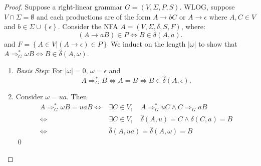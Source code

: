 \begin{proof}
  Suppose a right-linear grammar $G=\left( V,\Sigma,P,S \right)$. WLOG, suppose
  $V\cap \Sigma=\emptyset$ and each productions are of the form $A\to bC$ or $A\to\epsilon$ where
  $A,C\in V$ and $b\in \Sigma\cup \left\{ \epsilon \right\} $. Consider the
  NFA $A=\left( V,\Sigma,\delta,S,F \right) $, where:
  \[\left( A\to aB \right)\in P\iff B\in \delta\left( A,a \right).\]
  and $F =\left\{ A\in V|(A\to\epsilon)\in P \right\} $
  We induct on the length $\left| \omega \right| $ to show that $A \Rightarrow _G^{*}\omega B\iff B\in \hat{\delta}\left( A,\omega \right) $.
  \begin{enumerate}
    \item \textit{Basis Step}: For $\left| \omega \right| =0$, $\omega=\epsilon$ and
      \[A \Rightarrow _G^{*}B\iff A=B \iff B\in \hat{\delta}\left( A,\epsilon \right).\]
    \item Consider $\omega=ua$. Then
      \begin{align*}
        A \Rightarrow _G^{*} \omega B=uaB\iff&\exists C\in V,\quad A\Rightarrow _G^{*}uC\wedge C\Rightarrow _G aB\\
        \iff&\exists C\in V,\quad\hat{\delta}\left( A,u \right) =C\wedge \delta\left( C,a \right) =B\\
        \iff&\hat{\delta}\left( A,ua \right)=\hat{\delta}\left( A,\omega \right)  =B
      \end{align*}\vspace{-4mm}\qed%
  \end{enumerate} 
\end{proof}


